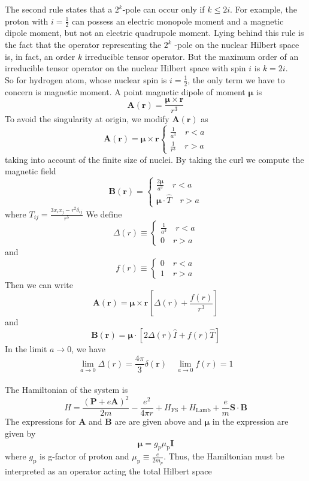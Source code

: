 \documentclass[cyan]{elegantnote}
\begin{document}
The second rule states that a $2^k$-pole can occur only if $k \leq 2i$. For example, the proton with $i = \frac{1}{2}$ can possess an electric monopole moment and a magnetic dipole moment, but not an electric quadrupole moment. Lying behind this rule is the fact that the operator representing the $2^k$ -pole on the nuclear Hilbert space is, in fact, an order $k$ irreducible tensor operator. But the maximum order of an irreducible tensor operator on the nuclear Hilbert space with
spin $i$ is $k = 2i$.\\
So for hydrogen atom, whose nuclear spin is $i = \frac{1}{2}$, the only term we have to concern is magnetic moment. A point magnetic dipole of moment $\bm{\mu}$ is
\[\bm{A}(\bm{r}) = \frac{\bm{\mu}\times\bm{r}}{r^3}\]
To avoid the singularity at origin, we modify $\bm{A}(\bm{r})$ as
\[\bm{A}(\bm{r}) = \bm{\mu}\times\bm{r} \begin{cases} \frac{1}{a^3} \quad r < a\\ \frac{1}{r^3} \quad r > a\end{cases} \]
taking into account of the finite size of nuclei. 
By taking the curl we compute the magnetic field
\[\bm{B}(\bm{r}) =  \begin{cases} \frac{2\bm{\mu}}{a^3} \quad r < a\\ \bm{\mu}\cdot\hat{T} \quad r > a\end{cases} \]
where $T_{ij} = \frac{3x_ix_j-r^2\delta_{ij}}{r^5}$
We define
\[\Delta(r) \equiv \begin{cases} \frac{1}{a^3} \quad r < a\\ 0 \quad r > a\end{cases}\]
and
\[f(r) \equiv \begin{cases} 0 \quad r < a\\ 1 \quad r > a\end{cases}\]
Then we can write
\[\bm{A}(\bm{r}) = \bm{\mu}\times\bm{r} \left [\Delta(r) + \frac{f(r)}{r^3}\right ] \]
and
\[\bm{B}(\bm{r}) = \bm{\mu}\cdot \left [2\Delta(r)\hat{I} + f(r)\hat{T}\right ] \]
In the limit $a \to 0$, we have
\[\lim_{a \to 0} \Delta(r) = \frac{4\pi}{3}\delta(\bm{r}) \quad \lim_{a \to 0} f(r) = 1\]\\
The Hamiltonian of the system is
\[H = \frac{(\bm{P}+e\bm{A})^2}{2m} - \frac{e^2}{4\pi r} + H_{\mathrm{FS}} + H_{\mathrm{Lamb}} + \frac{e}{m}\bm{S}\cdot\bm{B}\]
The expressions  for $\bm{A}$ and $\bm{B}$ are are given above and $\bm{\mu}$ in the expression are given by
\[\bm{\mu} = g_{p} \mu_{\mathrm{p}} \bm{I}\]
where $g_{\mathrm{p}}$ is g-factor of proton and $\mu_{\mathrm{p}} \equiv \frac{e}{2m_p}$. Thus, the Hamiltonian must be interpreted as an operator acting the total Hilbert space
\end{document}
